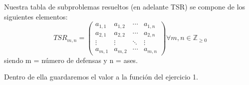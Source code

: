 Nuestra tabla de subproblemas resueltos (en adelante TSR) se compone de los siguientes elementos:\newline
\begin{equation*}
    TSR_{m,n} = 
    \begin{pmatrix}
    a_{1,1} & a_{1,2} & \cdots & a_{1,n} \\
    a_{2,1} & a_{2,2} & \cdots & a_{2,n} \\
    \vdots  & \vdots  & \ddots & \vdots  \\
    a_{m,1} & a_{m,2} & \cdots & a_{m,n} 
    \end{pmatrix}
\forall m,n \in \mathbb{Z}_{\geq 0}
\end{equation*}
siendo m = número de defensas y n = ases. \newline

Dentro de ella guardaremos el valor a la función del ejercicio 1.